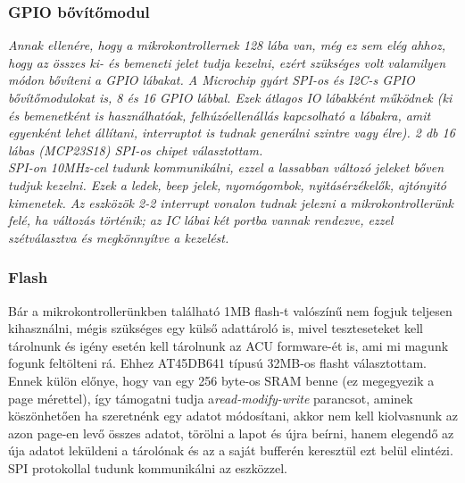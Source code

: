 \documentclass[a4paper, 12pt]{article}
\newcommand{\tab}{\hspace*{1em}}
\begin{document}
\subsubsection{GPIO bővítőmodul}
\emph{
\tab Annak ellenére, hogy a mikrokontrollernek 128 lába van, még ez sem elég ahhoz, hogy az összes ki- és bemeneti jelet tudja kezelni, ezért szükséges volt valamilyen módon bővíteni a GPIO lábakat. A Microchip\textregistered{} gyárt SPI-os és I2C-s GPIO bővítőmodulokat is, 8 és 16 GPIO lábbal. Ezek átlagos IO lábakként működnek (ki és bemenetként is használhatóak, felhúzóellenállás kapcsolható a lábakra, amit egyenként lehet állítani, interruptot is tudnak generálni szintre vagy élre). 2 db 16 lábas (MCP23S18) \cite{mcp23s18} SPI-os chipet választottam.\\
SPI-on 10MHz-cel tudunk kommunikálni, ezzel a lassabban változó jeleket bőven tudjuk kezelni. Ezek a ledek, beep jelek, nyomógombok, nyitásérzékelők, ajtónyitó kimenetek. Az eszközök 2-2 interrupt vonalon tudnak jelezni a mikrokontrollerünk felé, ha változás történik; az IC lábai két portba vannak rendezve, ezzel szétválasztva és megkönnyítve a kezelést.}


\subsubsection{Flash}
\tab Bár a mikrokontrollerünkben található 1MB flash-t valószínű nem fogjuk teljesen kihasználni, mégis szükséges egy külső adattároló is, mivel teszteseteket kell tárolnunk és igény esetén kell tárolnunk az ACU formware-ét is, ami mi magunk fogunk feltölteni rá. Ehhez AT45DB641 \cite{flash} típusú 32MB-os flasht választottam. Ennek külön előnye, hogy van egy 256 byte-os SRAM benne (ez megegyezik a page mérettel), így támogatni tudja a\emph{read-modify-write} parancsot, aminek köszönhetően ha szeretnénk egy adatot módosítani, akkor nem kell kiolvasnunk az azon page-en levő összes adatot, törölni a lapot és újra beírni, hanem elegendő az úja adatot leküldeni a tárolónak és az a saját bufferén keresztül ezt belül elintézi. SPI protokollal tudunk kommunikálni az eszközzel.
\end{document}
